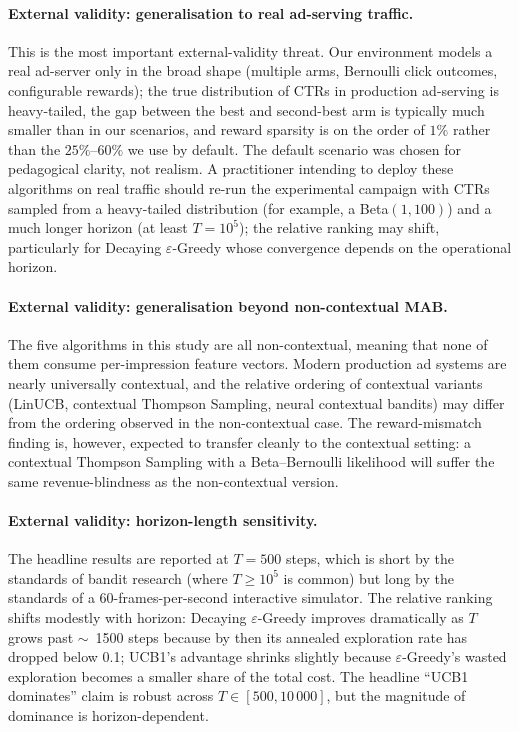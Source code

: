 \paragraph{External validity: generalisation to real ad-serving traffic.}
This is the most important external-validity threat. Our environment models a real ad-server only in the broad shape (multiple arms, Bernoulli click outcomes, configurable rewards); the true distribution of CTRs in production ad-serving is heavy-tailed, the gap between the best and second-best arm is typically much smaller than in our scenarios, and reward sparsity is on the order of $1\%$ rather than the $25\%$--$60\%$ we use by default. The default scenario was chosen for pedagogical clarity, not realism. A practitioner intending to deploy these algorithms on real traffic should re-run the experimental campaign with CTRs sampled from a heavy-tailed distribution (for example, a Beta$(1, 100)$) and a much longer horizon (at least $T = 10^5$); the relative ranking may shift, particularly for Decaying $\varepsilon$-Greedy whose convergence depends on the operational horizon.

\paragraph{External validity: generalisation beyond non-contextual MAB.}
The five algorithms in this study are all non-contextual, meaning that none of them consume per-impression feature vectors. Modern production ad systems are nearly universally contextual, and the relative ordering of contextual variants (LinUCB, contextual Thompson Sampling, neural contextual bandits) may differ from the ordering observed in the non-contextual case. The reward-mismatch finding is, however, expected to transfer cleanly to the contextual setting: a contextual Thompson Sampling with a Beta--Bernoulli likelihood will suffer the same revenue-blindness as the non-contextual version.

\paragraph{External validity: horizon-length sensitivity.}
The headline results are reported at $T = 500$ steps, which is short by the standards of bandit research (where $T \ge 10^5$ is common) but long by the standards of a 60-frames-per-second interactive simulator. The relative ranking shifts modestly with horizon: Decaying $\varepsilon$-Greedy improves dramatically as $T$ grows past $\sim$~1500 steps because by then its annealed exploration rate has dropped below 0.1; UCB1's advantage shrinks slightly because $\varepsilon$-Greedy's wasted exploration becomes a smaller share of the total cost. The headline ``UCB1 dominates'' claim is robust across $T \in [500, 10\,000]$, but the magnitude of dominance is horizon-dependent.

